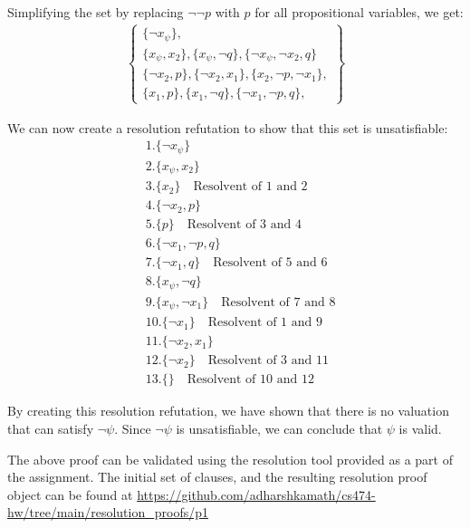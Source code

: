 \documentclass[12pt,letterpaper, onecolumn]{exam}
\newcommand{\link}[1]{{\color{blue}\href{#1}{#1}}}
\begin{document}
\begin{questions}
	Simplifying the set by replacing $ \neg \neg p $ with $ p $ for all propositional variables, we get:
	\begin{align*}
		\left .
			\begin{cases}
				\{ \neg x_{\psi} \}, \\
				\{ x_{\psi}, x_2 \}, \{ x_{\psi}, \neg q \}, \{ \neg x_{\psi}, \neg x_2, q \} \\
				\{ \neg x_2, p \}, \{ \neg x_2, x_1 \}, \{ x_2, \neg p, \neg x_1  \}, \\
				\{ x_1, p \}, \{ x_1, \neg q \}, \{ \neg x_1, \neg p, q \},
			\end{cases}
		\right\}
	\end{align*}

	We can now create a resolution refutation to show that this set is unsatisfiable:
	\begin{align*}
		& 1. \{ \neg x_{\psi} \} \\
		& 2. \{ x_{\psi}, x_2 \} \\
		& 3. \{ x_2 \} \quad \text{Resolvent of 1 and 2} \\
		& 4. \{ \neg x_2, p \} \\
		& 5. \{ p \} \quad \text{Resolvent of 3 and 4} \\
		& 6. \{ \neg x_1, \neg p, q \} \\
		& 7. \{ \neg x_1, q \} \quad \text{Resolvent of 5 and 6} \\
		& 8. \{ x_{\psi}, \neg q \} \\ 
		& 9. \{ x_{\psi}, \neg x_1 \} \quad \text{Resolvent of 7 and 8} \\
		& 10. \{ \neg x_1 \} \quad \text{Resolvent of 1 and 9} \\
		& 11. \{ \neg x_2, x_1 \} \\
		& 12. \{ \neg x_2 \} \quad \text{Resolvent of 3 and 11} \\
		& 13. \{  \} \quad \text{Resolvent of 10 and 12}
	\end{align*}

	By creating this resolution refutation, we have shown that there is no valuation that can satisfy $ \neg \psi $.
	Since $ \neg \psi $ is unsatisfiable, we can conclude that $ \psi $ is valid.

	The above proof can be validated using the resolution tool provided as a part of the assignment.
	The initial set of clauses, and the resulting resolution proof object can be found at 
	\link{https://github.com/adharshkamath/cs474-hw/tree/main/resolution\_proofs/p1}


\end{questions}
\end{document}
